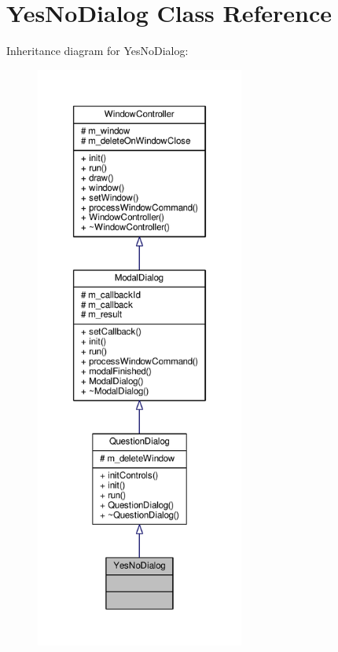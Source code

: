 \hypertarget{classYesNoDialog}{}\section{Yes\+No\+Dialog Class Reference}
\label{classYesNoDialog}


Inheritance diagram for Yes\+No\+Dialog\+:
\nopagebreak
\begin{figure}[H]
\begin{center}
\leavevmode
\includegraphics[height=550pt]{d8/d30/classYesNoDialog__inherit__graph}
\end{center}
\end{figure}


